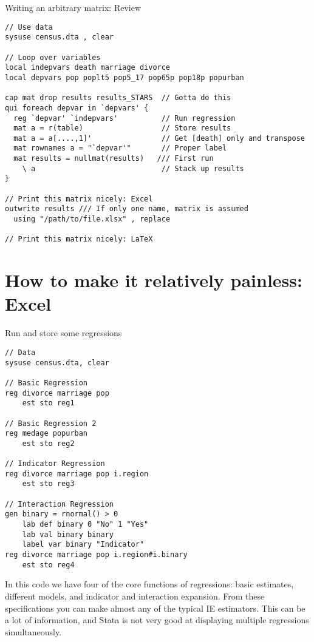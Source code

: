 \documentclass[aspectratio=169]{beamer}
\begin{document}
\begin{frame}[fragile]{Writing an arbitrary matrix: Review}
\begin{lstlisting}
// Use data
sysuse census.dta , clear

// Loop over variables
local indepvars death marriage divorce
local depvars pop poplt5 pop5_17 pop65p pop18p popurban

cap mat drop results results_STARS  // Gotta do this
qui foreach depvar in `depvars' {
  reg `depvar' `indepvars'          // Run regression
  mat a = r(table)                  // Store results
  mat a = a[....,1]'                // Get [death] only and transpose
  mat rownames a = "`depvar'"       // Proper label
  mat results = nullmat(results)   /// First run
    \ a                             // Stack up results
}

// Print this matrix nicely: Excel
outwrite results /// If only one name, matrix is assumed
  using "/path/to/file.xlsx" , replace
  
// Print this matrix nicely: LaTeX
\end{lstlisting}
\end{frame}

\section{How to make it relatively painless: Excel}

\begin{frame}[fragile]{Run and store some regressions}
\begin{multicols}{2}
\begin{lstlisting}
// Data
sysuse census.dta, clear

// Basic Regression
reg divorce marriage pop
    est sto reg1

// Basic Regression 2
reg medage popurban
    est sto reg2

// Indicator Regression
reg divorce marriage pop i.region
    est sto reg3

// Interaction Regression
gen binary = rnormal() > 0
    lab def binary 0 "No" 1 "Yes"
    lab val binary binary
    label var binary "Indicator"
reg divorce marriage pop i.region#i.binary
    est sto reg4
\end{lstlisting}
\parbox{\linewidth}{
In this code we have four of the core functions of regressions: basic estimates, different models, and indicator and interaction expansion.
\newline \newline
From these specifications you can make almost any of the typical IE estimators.
\newline \newline
This can be a lot of information, and Stata is not very good at displaying multiple regressions simultaneously.
}
\end{multicols}
\end{frame}
\end{document}
